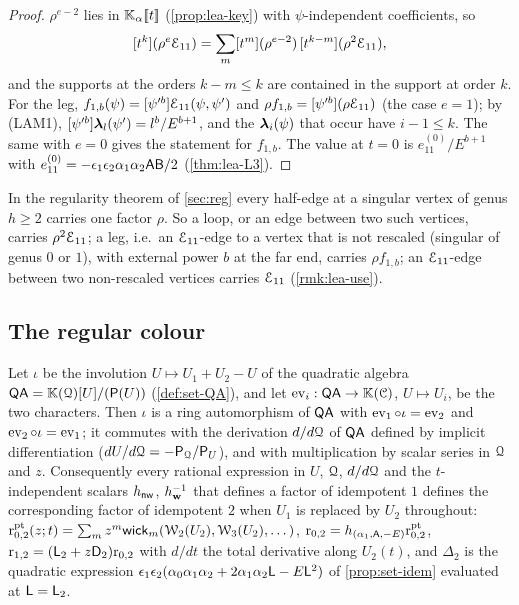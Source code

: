 \begin{proof}
$\rho^{e-2}$ lies in $\mathbb{K}_{\alpha}[\![ t ]\!]$ (\cref{prop:lea-key}) with $\psi$-independent coefficients, so
\[
[t^k](\rho^e\mathcal{E}_{11}) = \sum_m[t^m](\rho^{e-2})\,[t^{k-m}](\rho^2\mathcal{E}_{11}),
\]
and the supports at the orders $k-m\leq k$ are contained in the support at order $k$. For the leg, $f_{1,b}(\psi) = [\psi'^b]\mathcal{E}_{11}(\psi,\psi')$ and $\rho f_{1,b} = [\psi'^b](\rho\mathcal{E}_{11})$ (the case $e = 1$); by (LAM1), $[\psi'^b]\boldsymbol{\lambda}_l(\psi') = l^b/E^{b+1}$, and the $\boldsymbol{\lambda}_i(\psi)$ that occur have $i-1\leq k$. The same with $e = 0$ gives the statement for $f_{1,b}$. The value at $t = 0$ is $e^{(0)}_{11}/E^{b+1}$ with $e^{(0)}_{11} = -\epsilon_1\epsilon_2\alpha_1\alpha_2\mathsf{A}\mathsf{B}/2$ (\cref{thm:lea-L3}).
\end{proof}

In the regularity theorem of \cref{sec:reg} every half-edge at a singular vertex of genus $h\geq 2$ carries one factor $\rho$. So a loop, or an edge between two such vertices, carries $\rho^2\mathcal{E}_{11}$; a leg, i.e.\ an $\mathcal{E}_{11}$-edge to a vertex that is not rescaled (singular of genus $0$ or $1$), with external power $b$ at the far end, carries $\rho f_{1,b}$; an $\mathcal{E}_{11}$-edge between two non-rescaled vertices carries $\mathcal{E}_{11}$ (\cref{rmk:lea-use}).

\subsection{The regular colour}
\label{sec:lea-regular}

\begin{lem}
\label{lem:lea-conj}
Let $\iota$ be the involution $U\mapsto U_1+U_2-U$ of the quadratic algebra $\mathsf{QA} = \mathbb{K}(\mathcal{Q})[U]/(\mathsf{P}(U))$ (\cref{def:set-QA}), and let $\operatorname{ev}_i : \mathsf{QA}\to\mathbb{K}(\mathcal{C})$, $U\mapsto U_i$, be the two characters. Then $\iota$ is a ring automorphism of $\mathsf{QA}$ with $\operatorname{ev}_1\circ\iota = \operatorname{ev}_2$ and $\operatorname{ev}_2\circ\iota = \operatorname{ev}_1$; it commutes with the derivation $d/d\mathcal{Q}$ of $\mathsf{QA}$ defined by implicit differentiation ($dU/d\mathcal{Q} = -\mathsf{P}_{\mathcal{Q}}/\mathsf{P}_U$), and with multiplication by scalar series in $\mathcal{Q}$ and $z$. Consequently every rational expression in $U$, $\mathcal{Q}$, $d/d\mathcal{Q}$ and the $t$-independent scalars $h_{\mathsf{nw}}$, $h_{\mathbf{w}}^{-1}$ that defines a factor of idempotent $1$ defines the corresponding factor of idempotent $2$ when $U_1$ is replaced by $U_2$ throughout: $\mathrm{r}^{\mathrm{pt}}_{0,2}(z;t) = \sum_mz^m\mathsf{wick}_m(\mathcal{W}_2(U_2),\mathcal{W}_3(U_2),\dots)$, $\mathrm{r}_{0,2} = h_{(\alpha_1,\mathsf{A},-E)}\mathrm{r}^{\mathrm{pt}}_{0,2}$, $\mathrm{r}_{1,2} = (\mathsf{L}_2 + z\mathsf{D}_2)\mathrm{r}_{0,2}$ with $d/dt$ the total derivative along $U_2(t)$, and $\Delta_2$ is the quadratic expression $\epsilon_1\epsilon_2(\alpha_0\alpha_1\alpha_2 + 2\alpha_1\alpha_2\mathsf{L} - E\mathsf{L}^2)$ of \cref{prop:set-idem} evaluated at $\mathsf{L} = \mathsf{L}_2$.
\end{lem}

